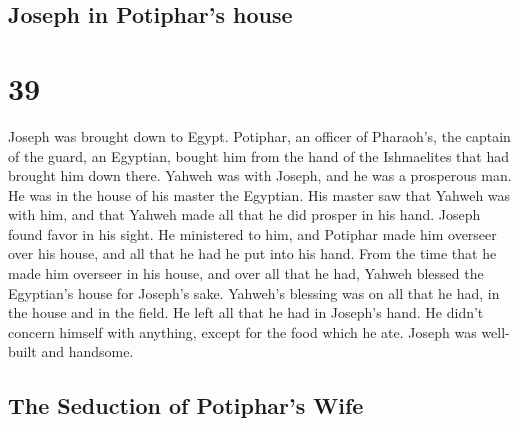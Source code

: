 \begin{paracol}{2}
\switchcolumn
\begin{otherlanguage}{english}

\hypertarget{joseph-in-potiphars-house}{%
\subsection{Joseph in Potiphar's
house}\label{joseph-in-potiphars-house}}

\hypertarget{section-77}{%
\section{39}\label{section-77}}

 Joseph was brought down to Egypt. Potiphar, an officer of
Pharaoh's, the captain of the guard, an Egyptian, bought him from the
hand of the Ishmaelites that had brought him down there. 
Yahweh was with Joseph, and he was a prosperous man. He was in the house
of his master the Egyptian.  His master saw that Yahweh
was with him, and that Yahweh made all that he did prosper in his hand.
 Joseph found favor in his sight. He ministered to him,
and Potiphar made him overseer over his house, and all that he had he
put into his hand.  From the time that he made him
overseer in his house, and over all that he had, Yahweh blessed the
Egyptian's house for Joseph's sake. Yahweh's blessing was on all that he
had, in the house and in the field.  He left all that he
had in Joseph's hand. He didn't concern himself with anything, except
for the food which he ate. Joseph was well-built and handsome.

\hypertarget{the-seduction-of-potiphars-wife}{%
\subsection{The Seduction of Potiphar's
Wife}\label{the-seduction-of-potiphars-wife}}


\end{otherlanguage}
\end{paracol}
